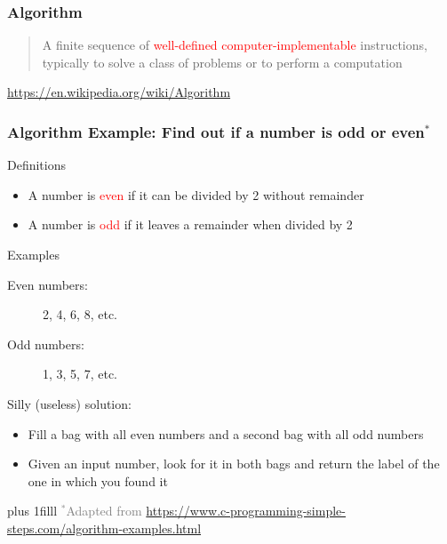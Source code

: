 \documentclass{beamer}
\newcommand{\btVFill}{\vskip0pt plus 1filll}
\newcommand{\light}[1]{\textcolor{gray}{#1}}
\newcommand{\red}[1]{\textcolor{red}{#1}}
\begin{document}
\begin{frame}
\frametitle{Algorithm}

\begin{quote}
 A finite sequence of \red{well-defined computer-implementable} instructions, 
typically to solve a class of problems or to perform a computation
\end{quote}
\begin{flushright}
\footnotesize
 \light{\url{https://en.wikipedia.org/wiki/Algorithm}}
\end{flushright}
\end{frame}

\begin{frame}
\frametitle{Algorithm Example: Find out if a number is odd or 
even$^*$}
\pause 

\alert{Definitions}

\begin{itemize}
 \item A number is \red{even} if it can be divided by 2 without remainder
 \item A number is \red{odd} if it leaves a remainder when divided by 2
\end{itemize}				\pause 

\alert{Examples}

\begin{description}
 \item[Even numbers:] 2, 4, 6, 8, etc. 
 \item[Odd numbers:] 1, 3, 5, 7, etc.
\end{description}			\pause 

\alert{Silly (useless) solution:}

\begin{itemize}
 \item Fill a bag with all even numbers and a second bag with all odd numbers
 \item Given an input number, look for it in both bags and return the label of 
the one in which you found it
\end{itemize}	

\btVFill
\onslide
\footnotesize
\light{
$^*$Adapted from 
\url{https://www.c-programming-simple-steps.com/algorithm-examples.html}}
\end{frame}
\end{document}
